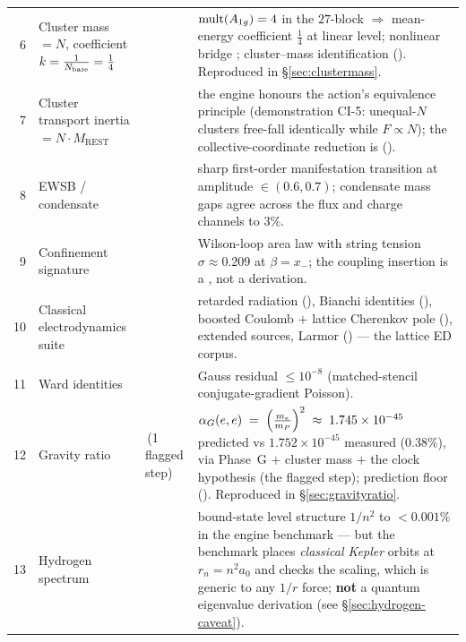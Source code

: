 \begin{xltabular}{\linewidth}{@{}r >{\RaggedRight}p{2.6cm} >{\RaggedRight}p{2.0cm} >{\RaggedRight}X@{}}
  6 & Cluster mass $= N$, coefficient $k=\tfrac{1}{N_{\mathrm{base}}}=\tfrac14$ &  &
    $\operatorname{mult}(A_{1g}) = 4$ in the $27$-block  $\Rightarrow$ mean-energy
    coefficient $\tfrac14$ at linear level; nonlinear bridge ;
    cluster--mass identification  (). Reproduced in
    \S\ref{sec:clustermass}. \\

  7 & Cluster transport inertia $= N\cdot M_{\mathrm{REST}}$ &  &
    the engine honours the action's equivalence principle (demonstration CI-5:
    unequal-$N$ clusters free-fall identically while $F \propto N$); the
    collective-coordinate reduction is  (). \\

  8 & EWSB / condensate &  &
    sharp first-order manifestation transition at amplitude $\in (0.6, 0.7)$;
    condensate mass gaps agree across the flux and charge channels to $3\%$. \\

  9 & Confinement signature &  &
    Wilson-loop area law with string tension $\sigma \approx 0.209$ at
    $\beta = x_-$; the coupling insertion is a , not a derivation. \\

  10 & Classical electrodynamics suite &  &
    retarded radiation (), Bianchi identities (),
    boosted Coulomb $+$ lattice Cherenkov pole (), extended sources,
    Larmor () --- the lattice ED corpus. \\

  11 & Ward identities &  &
    Gauss residual $\le 10^{-8}$ (matched-stencil conjugate-gradient Poisson). \\

  12 & Gravity ratio & \,(1 flagged step) &
    $\alpha_G(e,e) \;=\; \Bigl(\tfrac{m_e}{m_P}\Bigr)^{2} \;\approx\; 1.745\times 10^{-45}$ predicted vs $1.752\times10^{-45}$ measured ($0.38\%$), via Phase~G
    $+$ cluster mass $+$ the clock hypothesis (the flagged  step);
    prediction floor  (). Reproduced in
    \S\ref{sec:gravityratio}. \\

  13 & Hydrogen spectrum &  &
    bound-state level structure $1/n^2$ to $< 0.001\%$ in the engine benchmark
    --- but the benchmark places \emph{classical Kepler} orbits at $r_n = n^2 a_0$
    and checks the scaling, which is generic to any $1/r$ force; \textbf{not} a
    quantum eigenvalue derivation (see \S\ref{sec:hydrogen-caveat}). \\


\end{xltabular}
